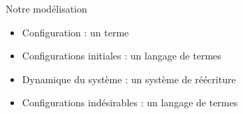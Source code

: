 \begin{frame}{Notre modélisation}
  \begin{block}{}
    \begin{itemize}[<+->]
    \item Configuration : un terme
    \item Configurations initiales : un langage de termes
    \item Dynamique du système : un système de réécriture
    \item Configurations indésirables : un langage de termes
    \end{itemize}
  \end{block}
\end{frame}
